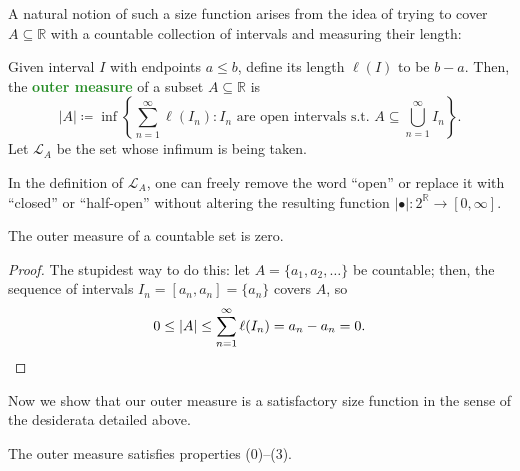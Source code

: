 \documentclass[11pt]{scrartcl}
\providecommand{\RR}{\mathbb R}
\providecommand{\vocab}[1]{{\textbf{\textcolor{ForestGreen}{#1}}}}
\providecommand{\abs}[1]{\left\lvert #1\right\rvert}
\begin{document}
A natural notion of such a size function arises
from the idea of trying to cover $A\subseteq\RR$ with
a countable collection of intervals and measuring their length:
\begin{definition}
    \label{def:outermeasure}
    Given interval $I$ with endpoints $a\le b$,
    define its length $\ell(I)$ to be $b-a$.
    Then, the \vocab{outer measure} of a subset $A\subseteq\RR$ is
    \begin{equation*}
        |A| \coloneq
	\inf\left\{
	    \sum_{n=1}^\infty \ell(I_n) :
	    I_n\text{ are open intervals s.t. }
	    A\subseteq \bigcup_{n=1}^\infty I_n
	\right\}.
    \end{equation*}
    Let $\mathcal L_A$ be the set whose infimum is being taken.
\end{definition}

\begin{lemma}[HW01 Problem 4]
    \label{lem:om-endpoints-irrelevant}
    In the definition of $\mathcal L_A$,
    one can freely remove the word ``open''
    or replace it with ``closed'' or ``half-open''
    without altering the resulting function $\abs{\bullet}\colon 2^\RR\to[0,\infty]$.
\end{lemma}

\begin{corollary}
    \label{coro:om-countable-zero}
    The outer measure of a countable set is zero.
\end{corollary}

\begin{proof}
    The stupidest way to do this:
    let $A = \{a_1, a_2, \dots\}$ be countable; then,
    the sequence of intervals $I_n = [a_n, a_n] = \{a_n\}$ covers $A$, so
    \begin{equation*}
        0\le\abs{A}\le \sum_{n=1}^\infty \ell(I_n) = a_n-a_n = 0.\qedhere
    \end{equation*}
\end{proof}

Now we show that our outer measure is a satisfactory size function
in the sense of the desiderata detailed above.

\begin{prop}
    \label{prop:om-properties}
    The outer measure satisfies properties (0)--(3).
\end{prop}
\end{document}
